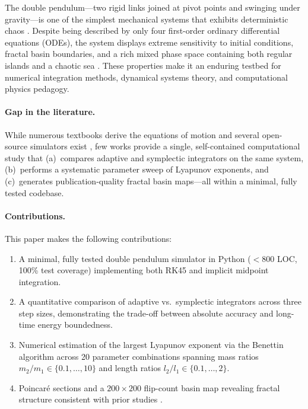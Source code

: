 \documentclass[11pt,a4paper]{article}
\begin{document}
The double pendulum---two rigid links joined at pivot points and swinging under
gravity---is one of the simplest mechanical systems that exhibits deterministic
chaos \citep{shinbrot1992chaos,levien1993double}. Despite being described by
only four first-order ordinary differential equations (ODEs), the system displays
extreme sensitivity to initial conditions, fractal basin boundaries, and a rich
mixed phase space containing both regular islands and a chaotic sea
\citep{stachowiak2006numerical}. These properties make it an enduring testbed
for numerical integration methods, dynamical systems theory, and computational
physics pedagogy.

\paragraph{Gap in the literature.}
While numerous textbooks derive the equations of motion
\citep{goldstein2002classical,landau1976mechanics} and several open-source
simulators exist \citep{dassencio_double_pendulum,cristello_double_pendulum,
scipython_double_pendulum}, few works provide a single, self-contained
computational study that (a)~compares adaptive and symplectic integrators on the
same system, (b)~performs a systematic parameter sweep of Lyapunov exponents, and
(c)~generates publication-quality fractal basin maps---all within a minimal,
fully tested codebase.

\paragraph{Contributions.}
This paper makes the following contributions:
\begin{enumerate}
  \item A minimal, fully tested double pendulum simulator in Python ($<$800 LOC,
        100\% test coverage) implementing both RK45 and implicit midpoint
        integration.
  \item A quantitative comparison of adaptive vs.\ symplectic integrators across
        three step sizes, demonstrating the trade-off between absolute accuracy
        and long-time energy boundedness.
  \item Numerical estimation of the largest Lyapunov exponent via the Benettin
        algorithm across 20 parameter combinations spanning mass ratios
        $m_2/m_1 \in \{0.1,\ldots,10\}$ and length ratios
        $l_2/l_1 \in \{0.1,\ldots,2\}$.
  \item Poincar\'e sections and a $200\times200$ flip-count basin map revealing
        fractal structure consistent with prior studies
        \citep{shinbrot1992chaos,stachowiak2006numerical}.
\end{enumerate}
\end{document}
